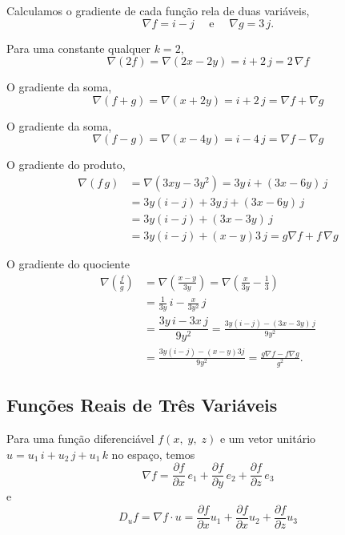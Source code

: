 \solo
Calculamos o gradiente de cada função rela de duas variáveis,
\begin{equation*}
	\nabla f = i-j\quad \text{ e } \quad \nabla g =3\,j.
\end{equation*}

Para uma constante qualquer \( k =2\),
\begin{equation*}
	\nabla(2f) = \nabla (2x-2y)=i+ 2\,j=2\,\nabla f
\end{equation*}

O gradiente da soma,
\begin{equation*}
	\nabla(f+g)= \nabla(x+2y) = i + 2\, j=\nabla f + \nabla g
\end{equation*}

O gradiente da soma,
\begin{equation*}
	\nabla(f-g)= \nabla(x-4y) = i -4\, j=\nabla f - \nabla g
\end{equation*}

O gradiente do produto,
\begin{align*}
	\nabla(f\, g) &= \nabla (3xy-3y^{2}) = 3y\, i +(3x-6y)\, j \\[2ex]
	&= 3y(i-j)+3y\,j+(3x-6y)\,j\\[2ex]
	&= 3y(i-j)+(3x-3y)\,j\\[2ex]
	&= 3y(i-j)+(x-y)3\,j = g\nabla f+ f\, \nabla g
\end{align*}

O gradiente do quociente
\begin{align*}
	\nabla\left(\frac{f}{g}\right) & = \nabla \left(\frac{x-y}{3y} \right)= \nabla \left(\frac{x}{3y}-\frac{1}{3}\right) \\
	& = \frac{1}{3y}\, i -\frac{x}{3y^{2}}\,j\\
	&=\dfrac{3y\,i-3x\,j}{9y^{2}}=\frac{3y(i-j)-(3x-3y)\, j}{9y^{2}}\\
	&=\frac{3y(i-j)-(x-y)3j}{9y^{2}}=\frac{g\nabla f-f\nabla g}{g^{2}}.
\end{align*}

%
\subsection{Funções Reais de Três Variáveis}
%
Para uma função diferenciável \(f(x,\; y,\; z)\) e um vetor unitário \(u = u_{1}\,i +u_{2}\,j+u_{1}\,k\) no espaço, temos
\begin{equation*}
	\nabla f = \frac{\partial f}{\partial x}\, e_{1}+\frac{\partial f}{\partial y}\, e_{2} +
	\frac{\partial f}{\partial z}\, e_{3}
\end{equation*}
e
\begin{equation*}
	D_{u}f= \nabla f \cdot u =\frac{\partial f}{\partial x}u_{1}+\frac{\partial f}{\partial x}u_{2}
	+\frac{\partial f}{\partial z}u_{3}
\end{equation*}

